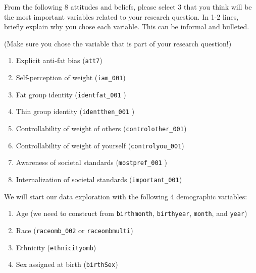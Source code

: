\documentclass[
  letterpaper,
  DIV=11,
  numbers=noendperiod]{scrartcl}
\providecommand{\tightlist}{%
  \setlength{\itemsep}{0pt}\setlength{\parskip}{0pt}}\usepackage{longtable,booktabs,array}
\begin{document}
\begin{tcolorbox}[enhanced jigsaw, left=2mm, opacitybacktitle=0.6, arc=.35mm, colback=white, colframe=quarto-callout-important-color-frame, bottomrule=.15mm, opacityback=0, toptitle=1mm, toprule=.15mm, titlerule=0mm, colbacktitle=quarto-callout-important-color!10!white, rightrule=.15mm, leftrule=.75mm, title=\textcolor{quarto-callout-important-color}{\faExclamation}\hspace{0.5em}{Task}, breakable, bottomtitle=1mm, coltitle=black]

From the following 8 attitudes and beliefs, please select 3 that you
think will be the most important variables related to your research
question. In 1-2 lines, briefly explain why you chose each variable.
This can be informal and bulleted.

\end{tcolorbox}

(Make sure you chose the variable that is part of your research
question!)

\begin{enumerate}
\def\labelenumi{\arabic{enumi}.}
\tightlist
\item
  Explicit anti-fat bias (\texttt{att7})
\item
  Self-perception of weight (\texttt{iam\_001})
\item
  Fat group identity (\texttt{identfat\_001} )
\item
  Thin group identity (\texttt{identthen\_001} )
\item
  Controllability of weight of others (\texttt{controlother\_001})
\item
  Controllability of weight of yourself (\texttt{controlyou\_001})
\item
  Awareness of societal standards (\texttt{mostpref\_001} )
\item
  Internalization of societal standards (\texttt{important\_001})
\end{enumerate}

We will start our data exploration with the following 4 demographic
variables:

\begin{enumerate}
\def\labelenumi{\arabic{enumi}.}
\tightlist
\item
  Age (we need to construct from \texttt{birthmonth},
  \texttt{birthyear}, \texttt{month}, and \texttt{year})
\item
  Race (\texttt{raceomb\_002} or \texttt{raceombmulti})
\item
  Ethnicity (\texttt{ethnicityomb})
\item
  Sex assigned at birth (\texttt{birthSex})
\end{enumerate}
\end{document}
